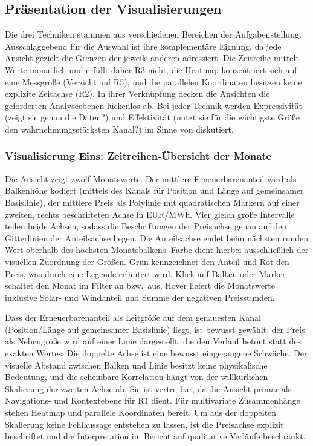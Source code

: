\subsection{Präsentation der Visualisierungen}\label{sec:praesentation}

Die drei Techniken stammen aus verschiedenen Bereichen der Aufgabenstellung. Ausschlaggebend für die Auswahl ist ihre komplementäre Eignung, da jede Ansicht gezielt die Grenzen der jeweils anderen adressiert. Die Zeitreihe mittelt Werte monatlich und erfüllt daher R3 nicht, die Heatmap konzentriert sich auf eine Messgröße (Verzicht auf R5), und die parallelen Koordinaten besitzen keine explizite Zeitachse (R2). In ihrer Verknüpfung decken die Ansichten die geforderten Analyseebenen lückenlos ab. Bei jeder Technik werden Expressivität
(zeigt sie genau die Daten?) und Effektivität (nutzt sie für die wichtigste Größe den
wahrnehmungsstärksten Kanal?) im Sinne von \cite{Munzner2014,Ware2012} diskutiert.

\subsubsection{Visualisierung Eins: Zeitreihen-Übersicht der Monate}\label{sec:vis1}

Die Ansicht zeigt zwölf Monatswerte. Der mittlere Erneuerbarenanteil wird
als Balkenhöhe kodiert (mittels des Kanals für Position und Länge auf gemeinsamer Basislinie), der mittlere Preis als
Polylinie mit quadratischen Markern auf einer zweiten, rechts beschrifteten Achse in EUR/MWh.
Vier gleich große Intervalle teilen beide Achsen, sodass die Beschriftungen der
Preisachse genau auf den Gitterlinien der Anteilsachse liegen. Die Anteilsachse endet beim
nächsten runden Wert oberhalb des höchsten Monatsbalkens. Farbe dient hierbei ausschließlich der
visuellen Zuordnung der Größen. Grün kennzeichnet den Anteil und Rot den Preis, was durch eine
Legende erläutert wird. Klick auf Balken oder Marker schaltet den Monat im Filter an bzw.\ aus, Hover liefert die
Monatswerte inklusive Solar- und Windanteil und Summe der negativen Preisstunden.

Dass der Erneuerbarenanteil als Leitgröße auf dem genauesten Kanal (Position/Länge auf gemeinsamer
Basislinie) liegt, ist bewusst gewählt, der Preis als Nebengröße wird auf einer
Linie dargestellt, die den Verlauf betont statt des exakten Wertes. Die doppelte Achse ist eine bewusst
eingegangene Schwäche. Der visuelle Abstand zwischen Balken und Linie besitzt keine physikalische Bedeutung, und die
scheinbare Korrelation hängt von der willkürlichen Skalierung der zweiten Achse ab. Sie ist
vertretbar, da die Ansicht primär als Navigations- und Kontextebene für R1 dient. Für multivariate
Zusammenhänge stehen Heatmap und parallele Koordinaten bereit. Um aus der doppelten Skalierung keine
Fehlaussage entstehen zu lassen, ist die Preisachse explizit beschriftet und die Interpretation im
Bericht auf qualitative Verläufe beschränkt.


